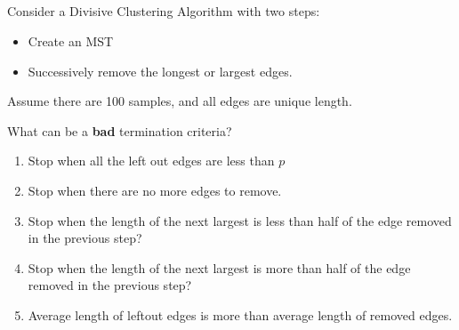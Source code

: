 \begin{frame}
\section{}
Consider a Divisive Clustering Algorithm with two steps:
\begin{itemize}
\item Create an MST
\item Successively remove the longest or largest edges.
\end{itemize}
Assume there are 100 samples, and all edges are unique length.

What can be a {\bf bad} termination criteria?

\begin{enumerate}[label=(\Alph*)]
\item Stop when all the left out edges are less than $p$
\item Stop when there are no more edges to remove.    %
\item Stop when the length of the next largest is less than half of the edge removed in the previous step?
\item Stop when the length of the next largest is more than half of the edge removed in the previous step?    %
\item Average length of leftout edges is more than average length of removed edges.   %
\end{enumerate}
\end{frame}
